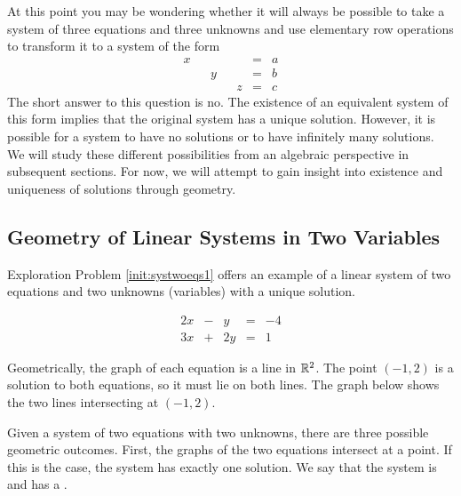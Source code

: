 \documentclass{ximera}
\begin{document}
At this point you may be wondering whether it will always be possible to take a system of three equations and three unknowns and use elementary row operations to transform it to a system of the form
$$\begin{array}{ccccccc}
      x & &&&&= &a \\
	 & &y&&&=&b\\
     & &&&z&=&c
    \end{array}$$
The short answer to this question is no.  The existence of an equivalent system of this form implies that the original system has a unique solution.  However, it is possible for a system to have no solutions or to have infinitely many solutions.  We will study these different possibilities from an algebraic perspective in subsequent sections.  For now, we will attempt to gain insight into existence and uniqueness of solutions through geometry.     

\subsection*{Geometry of Linear Systems in Two Variables}
Exploration Problem \ref{init:systwoeqs1} offers an example of a linear system of two equations and two unknowns (variables) with a unique solution.  

$$\begin{array}{ccccc}
      2x& -&y&=&-4\\
      3x & +&2y&= &1 
    \end{array}$$

Geometrically, the graph of each equation is a line in $\mathbb{R}^2$.  The point $(-1, 2)$ is a solution to both equations, so it must lie on both lines.
  The graph below shows the two lines intersecting at $(-1, 2)$.    
    
\begin{center}
\end{center}

Given a system of two equations with two unknowns, there are three possible geometric outcomes.  First, the graphs of the two equations intersect at a point.  If this is the case, the system has exactly one solution. We say that the system is  and has a .  
\end{document}
